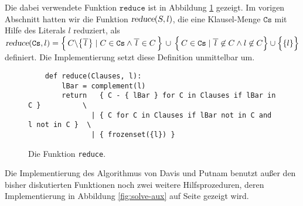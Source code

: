 Die dabei verwendete Funktion $\texttt{reduce}$ ist in Abbildung \ref{fig:reduce} gezeigt.
Im vorigen Abschnitt hatten wir die Funktion $\textsl{reduce}(S, l)$, die eine
Klausel-Menge $\texttt{Cs}$ mit Hilfe des Literals $l$ reduziert, als
\\[0.2cm]
\hspace*{1.3cm}
$\textsl{reduce}(\texttt{Cs},l)  = 
 \Bigl\{\, C \backslash \bigl\{\overline{\,l\,}\bigr\} \;|\; C \in \texttt{Cs} \wedge \overline{\,l\,} \in C \,\Bigr\} 
       \,\cup\, \Bigl\{\, C \in \texttt{Cs} \mid \overline{\,l\,} \not\in C \wedge l \not\in C \Bigr\} \cup \Bigl\{\{l\}\Bigr\}
$
\\[0.2cm]
definiert.
Die Implementierung setzt diese Definition unmittelbar um.  


\begin{figure}[!ht]
  \centering
\begin{verbatim}
    def reduce(Clauses, l):
        lBar = complement(l)
        return   { C - { lBar } for C in Clauses if lBar in C }          \
               | { C for C in Clauses if lBar not in C and l not in C }  \
               | { frozenset({l}) }
\end{verbatim}
\vspace*{-0.3cm}
  \caption{Die Funktion \texttt{reduce}. }
  \label{fig:reduce}
\end{figure} 

Die Implementierung des Algorithmus von Davis und Putnam benutzt außer den bisher diskutierten Funktionen
noch zwei weitere Hilfsprozeduren, deren Implementierung in 
Abbildung \ref{fig:solve-aux} auf Seite \pageref{fig:solve-aux} gezeigt wird.

